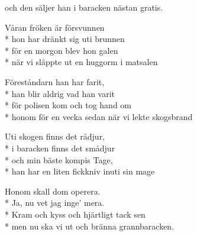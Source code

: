 \begin{SongText}
\begin{SongVerse}
        och den säljer han i baracken nästan gratis.
    \end{SongVerse}
    \begin{SongVerse}
        Våran fröken är försvunnen\\*%
        hon har dränkt sig uti brunnen\\*%
        för en morgon blev hon galen\\*%
        när vi släppte ut en huggorm i matsalen
    \end{SongVerse}
    \begin{SongVerse}
        Föreståndarn han har farit,\\*%
        han blir aldrig vad han varit\\*%
        för polisen kom och tog hand om\\*%
        honom för en vecka sedan när vi lekte skogsbrand
    \end{SongVerse}
    \begin{SongVerse}
        Uti skogen finns det rådjur,\\*%
        i baracken finns det smådjur\\*%
        och min bäste kompis Tage,\\*%
        han har en liten fickkniv inuti sin mage
    \end{SongVerse}
    \begin{SongVerse}
        Honom skall dom operera.\\*%
        Ja, nu vet jag inge’ mera.\\*%
        Kram och kyss och hjärtligt tack sen\\*%
        men nu ska vi ut och bränna grannbaracken.
    \end{SongVerse}
\end{SongText}
